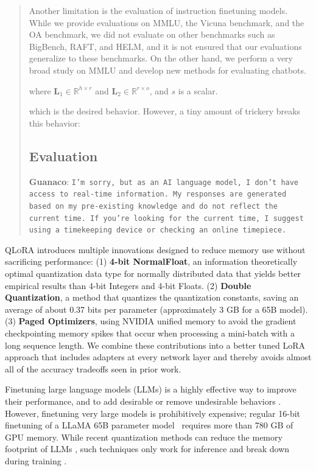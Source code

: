 \begin{quote}
Another limitation is the evaluation of instruction finetuning models. While we provide evaluations on MMLU, the Vicuna benchmark, and the OA benchmark, we did not evaluate on other benchmarks such as BigBench, RAFT, and HELM, and it is not ensured that our evaluations generalize to these benchmarks. On the other hand, we perform a very broad study on MMLU and develop new methods for evaluating chatbots.

where $\mathbf{L}_1\in  \mathbb{R}^{h\times r}$ and $\mathbf{L}_2\in  \mathbb{R}^{r\times o}$, and $s$ is a scalar.

which is the desired behavior. However, a tiny amount of trickery breaks this behavior:

\subsection{Evaluation}

    \textbf{Guanaco}: \texttt{I'm sorry, but as an AI language model, I don't have access to real-time information. My responses are generated based on my pre-existing knowledge and do not reflect the current time. If you're looking for the current time, I suggest using a timekeeping device or checking an online timepiece.}
\end{quote}

\textsc{QLoRA} introduces multiple innovations designed to reduce memory use without sacrificing performance: (1) \textbf{4-bit NormalFloat}, an information theoretically optimal quantization data type for normally distributed data that yields better empirical results than 4-bit Integers and 4-bit Floats. (2) \textbf{Double Quantization}, a method that quantizes the quantization constants, saving an average of about 0.37 bits per parameter (approximately 3 GB for a 65B model). (3) \textbf{Paged Optimizers}, using NVIDIA unified memory to avoid the gradient checkpointing memory spikes that occur when processing a mini-batch with a long sequence length. We combine these contributions into a better tuned LoRA approach that includes adapters at every network layer and thereby avoids almost all of the accuracy tradeoffs seen in prior work.

Finetuning large language models (LLMs) is a highly effective way to improve their performance, \citep{min2021metaicl, wei2021finetuned, ouyang2022training, wang2022super, wang2022self, liu2022few} and to add desirable or remove undesirable behaviors \citep{ouyang2022training,askell2021general,bai2022training}. However, finetuning very large models is prohibitively expensive; regular 16-bit finetuning of a LLaMA 65B parameter model~\citep{touvron2023llama} requires more than 780 GB of GPU memory. While recent quantization methods can reduce the memory footprint of LLMs \citep{dettmers2022llm, dettmers2022case, frantar2022gptq, xiao2022smoothquant}, such techniques only work for inference and break down during training \citep{wortsman2023stable}. 


